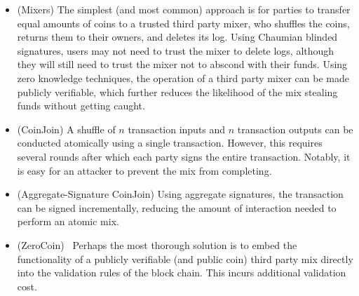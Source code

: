 \begin{itemize}
\item (Mixers) The simplest (and most common) approach is for parties to transfer equal amounts of coins to a trusted third party mixer, who shuffles the coins, returns them to their owners, and deletes its log. Using Chaumian blinded signatures, users may not need to trust the mixer to delete logs, although they will still need to trust the mixer not to abscond with their funds. Using zero knowledge techniques, the operation of a third party mixer can be made publicly verifiable, which further reduces the likelihood of the mix stealing funds without getting caught.
\item (CoinJoin) A shuffle of $n$ transaction inputs and $n$ transaction outputs can be conducted atomically using a single transaction. However, this requires several rounds after which each party signs the entire transaction. Notably, it is easy for an attacker to prevent the mix from completing.
\item (Aggregate-Signature CoinJoin) Using aggregate signatures, the transaction can be signed incrementally, reducing the amount of interaction needed to perform an atomic mix.
\item (ZeroCoin)~\cite{miers2013zerocoin} Perhaps the most thorough solution is to embed the functionality of a publicly verifiable (and public coin) third party mix directly into the validation rules of the block chain. This incurs additional validation cost.
\end{itemize}

